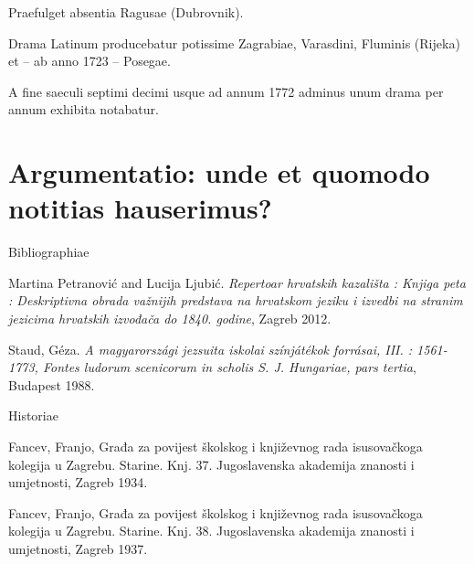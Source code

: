 \documentclass[14pt]{beamer}
\begin{document}
{
    \begin{frame}[plain]
    \end{frame}
}

\begin{frame}[standout]
  Praefulget absentia Ragusae (Dubrovnik).
\end{frame}

\begin{frame}
  Drama Latinum producebatur potissime \alert{Zagrabiae, Varasdini, Fluminis (Rijeka)} et -- ab anno 1723 -- \alert{Posegae}.

  A fine saeculi septimi decimi usque ad annum 1772 adminus unum drama per annum exhibita notabatur.
    \end{frame}


\section{Argumentatio: unde et quomodo notitias hauserimus?}

\begin{frame}{Bibliographiae}

Martina Petranović and Lucija Ljubić. \emph{Repertoar hrvatskih kazališta : Knjiga peta : Deskriptivna obrada važnijih predstava na hrvatskom jeziku i izvedbi na stranim jezicima hrvatskih izvođača do 1840. godine}, Zagreb 2012.

Staud, Géza. \emph{A magyarországi jezsuita iskolai színjátékok forrásai, III. : 1561-1773, Fontes ludorum scenicorum in scholis S. J. Hungariae, pars tertia}, Budapest 1988.

\end{frame}
\begin{frame}{Historiae}

Fancev, Franjo, Građa za povijest školskog i književnog rada
isusovačkoga kolegija u Zagrebu. Starine. Knj. 37. Jugoslavenska
akademija znanosti i umjetnosti, Zagreb 1934.

Fancev, Franjo, Građa za povijest školskog i književnog rada
isusovačkoga kolegija u Zagrebu. Starine. Knj. 38. Jugoslavenska
akademija znanosti i umjetnosti, Zagreb 1937.

\end{frame}
\end{document}
